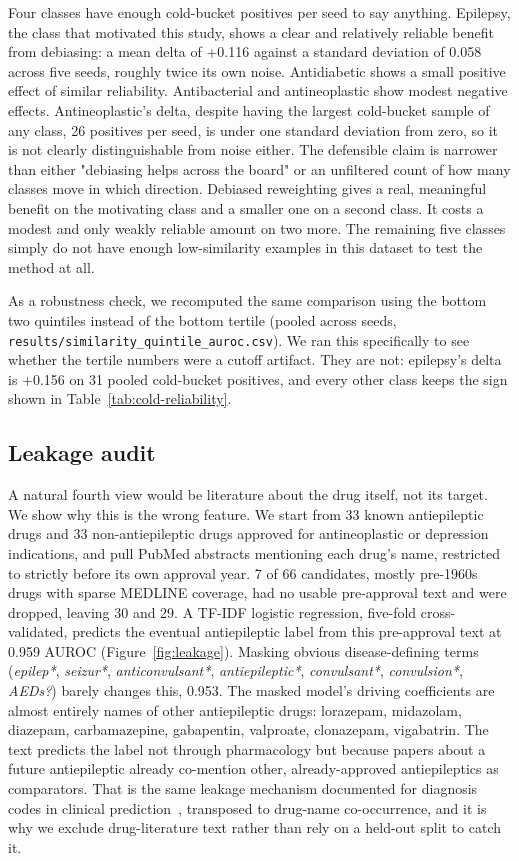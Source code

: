 \documentclass{llncs}
\begin{document}
Four classes have enough cold-bucket positives per seed to say anything. Epilepsy, the class that motivated this study, shows a clear and relatively reliable benefit from debiasing: a mean delta of +0.116 against a standard deviation of 0.058 across five seeds, roughly twice its own noise. Antidiabetic shows a small positive effect of similar reliability. Antibacterial and antineoplastic show modest negative effects. Antineoplastic's delta, despite having the largest cold-bucket sample of any class, 26 positives per seed, is under one standard deviation from zero, so it is not clearly distinguishable from noise either. The defensible claim is narrower than either "debiasing helps across the board" or an unfiltered count of how many classes move in which direction. Debiased reweighting gives a real, meaningful benefit on the motivating class and a smaller one on a second class. It costs a modest and only weakly reliable amount on two more. The remaining five classes simply do not have enough low-similarity examples in this dataset to test the method at all.

As a robustness check, we recomputed the same comparison using the bottom two quintiles instead of the bottom tertile (pooled across seeds, \texttt{results/similarity\_quintile\_auroc.csv}). We ran this specifically to see whether the tertile numbers were a cutoff artifact. They are not: epilepsy's delta is +0.156 on 31 pooled cold-bucket positives, and every other class keeps the sign shown in Table~\ref{tab:cold-reliability}.

\subsection{Leakage audit}
A natural fourth view would be literature about the drug itself, not its target. We show why this is the wrong feature. We start from 33 known antiepileptic drugs and 33 non-antiepileptic drugs approved for antineoplastic or depression indications, and pull PubMed abstracts mentioning each drug's name, restricted to strictly before its own approval year. 7 of 66 candidates, mostly pre-1960s drugs with sparse MEDLINE coverage, had no usable pre-approval text and were dropped, leaving 30 and 29. A TF-IDF logistic regression, five-fold cross-validated, predicts the eventual antiepileptic label from this pre-approval text at 0.959 AUROC (Figure~\ref{fig:leakage}). Masking obvious disease-defining terms (\emph{epilep*}, \emph{seizur*}, \emph{anticonvulsant*}, \emph{antiepileptic*}, \emph{convulsant*}, \emph{convulsion*}, \emph{AEDs?}) barely changes this, 0.953. The masked model's driving coefficients are almost entirely names of other antiepileptic drugs: lorazepam, midazolam, diazepam, carbamazepine, gabapentin, valproate, clonazepam, vigabatrin. The text predicts the label not through pharmacology but because papers about a future antiepileptic already co-mention other, already-approved antiepileptics as comparators. That is the same leakage mechanism documented for diagnosis codes in clinical prediction~\cite{labelleakage2023jamia,labelleakage2025jama}, transposed to drug-name co-occurrence, and it is why we exclude drug-literature text rather than rely on a held-out split to catch it.
\end{document}

